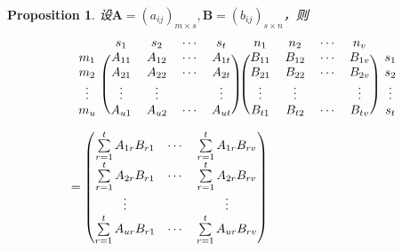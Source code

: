 \documentclass{article}
\newtheorem{proposition}[theorem]{Proposition}
\newcommand{\mbf}[1]{\bm{#1}}
\begin{document}
\begin{proposition}
\rm 设$\mbf{A}=(a_{ij})_{m \times s},\mbf{B}=(b_{ij})_{s \times n}$，则
$$
\begin{array}{ll}
&\begin{blockarray}{ccccc}
    & s_1    & s_2    & \cdots & s_t  \\
\begin{block}{c(cccc)}    
m_1 & A_{11} & A_{12} & \cdots & A_{1t} \\
m_2 & A_{21} & A_{22} & \cdots & A_{2t} \\
\vdots & \vdots & \vdots & 		 & \vdots \\
m_u & A_{u1} & A_{u2} & \cdots & A_{ut} \\
\end{block} 
\end{blockarray}~
\begin{blockarray}{ccccc}
n_1    & n_2    & \cdots & n_v  &\\
\begin{block}{(cccc)c}
B_{11} & B_{12} & \cdots & B_{1v} & s_1 \\
B_{21} & B_{22} & \cdots & B_{2v} & s_2 \\
\vdots & \vdots & 		 & \vdots & \vdots \\
B_{t1} & B_{t2} & \cdots & B_{tv} & s_t \\
\end{block}
\end{blockarray}\\
&= \begin{pmatrix}
\sum\limits_{r=1}^t A_{1r}B_{r1} & \cdots & \sum\limits_{r=1}^t A_{1r}B_{rv} \\
\sum\limits_{r=1}^t A_{2r}B_{r1} & \cdots & \sum\limits_{r=1}^t A_{2r}B_{rv} \\
\vdots && \vdots \\
\sum\limits_{r=1}^t A_{ur}B_{r1} & \cdots & \sum\limits_{r=1}^t A_{ur}B_{rv} 
\end{pmatrix}
\end{array}
$$
\end{proposition}
\end{document}
